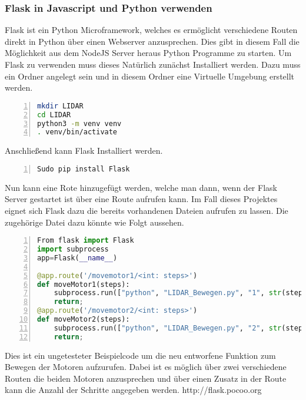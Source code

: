 \subsubsection{Flask in Javascript und Python verwenden}
Flask ist ein Python Microframework, welches es ermöglicht verschiedene Routen direkt in Python über einen Webserver anzusprechen. Dies gibt in diesem Fall die Möglichkeit aus dem NodeJS Server heraus Python Programme zu starten. 
Um Flask zu verwenden muss dieses Natürlich zunächst Installiert werden. Dazu muss ein Ordner angelegt sein und in diesem Ordner eine Virtuelle Umgebung erstellt werden. 
\begin{lstlisting}[caption={Installation Flask}, language={bash}, numbers=left]
mkdir LIDAR
cd LIDAR
python3 -m venv venv
. venv/bin/activate
\end{lstlisting}
Anschließend kann Flask Installiert werden.
\begin{lstlisting}[caption={Installation Flask}, language={bash}, numbers=left]
Sudo pip install Flask
\end{lstlisting}
Nun kann eine Rote hinzugefügt werden, welche man dann, wenn der Flask Server gestartet ist über eine Route aufrufen kann. 
Im Fall dieses Projektes eignet sich Flask dazu die bereits vorhandenen Dateien aufrufen zu lassen. Die zugehörige Datei dazu könnte wie Folgt aussehen.
\begin{lstlisting}[caption={Flask Beispielprogram}, language={python}, numbers=left]
From flask import Flask
import subprocess
app=Flask(__name__)

@app.route('/movemotor1/<int: steps>')
def moveMotor1(steps):
	subprocess.run(["python", "LIDAR_Bewegen.py", "1", str(steps)])
	return;
@app.route('/movemotor2/<int: steps>')
def moveMotor2(steps):
	subprocess.run(["python", "LIDAR_Bewegen.py", "2", str(steps)])
	return;

\end{lstlisting}
Dies ist ein ungetesteter Beispielcode um die neu entworfene Funktion zum Bewegen der Motoren aufzurufen. Dabei ist es möglich über zwei verschiedene Routen die beiden Motoren anzusprechen und über einen Zusatz in der Route kann die Anzahl der Schritte angegeben werden. 
http://flask.pocoo.org 



